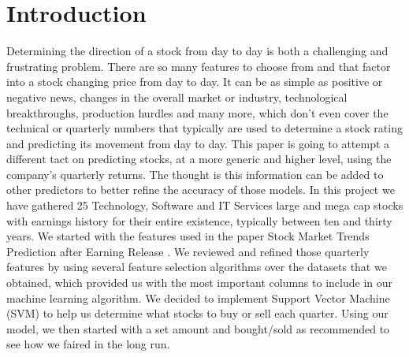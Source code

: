 \documentclass[conference]{IEEEtran}
\begin{document}
\section{Introduction}
Determining the direction of a stock from day to day is both a challenging and frustrating problem.  There are so many features to choose from and that factor into a stock changing price from day to day. It can be as simple as positive or negative news, changes in the overall market or industry, technological breakthroughs, production hurdles and many more, which don't even cover the technical or quarterly numbers that typically are used to determine a stock rating and predicting its movement from day to day.  This paper is going to attempt a different tact on predicting stocks, at a more generic and higher level, using the company's quarterly returns.  The thought is this information can be added to other predictors to better refine the accuracy of those models.  In this project we have gathered 25 Technology, Software and IT Services large and mega cap stocks with earnings history for their entire existence, typically between ten and thirty years.  We started with the features used in the paper Stock Market Trends Prediction after Earning Release  \cite{QuarterlyPrediction}.  We reviewed and refined those quarterly features by using several feature selection algorithms over the datasets that we obtained, which provided us with the most important columns to include in our machine learning algorithm.  We decided to implement Support Vector Machine (SVM) to help us determine what stocks to buy or sell each quarter.  Using our model, we then started with a set amount and bought/sold as recommended to see how we faired in the long run.
\end{document}
